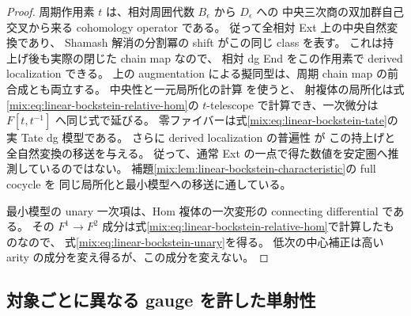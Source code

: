 \begin{proof}
周期作用素 $t$ は、相対周囲代数 $B_\epsilon$ から $D_\epsilon$ への
中央三次商の双加群自己交叉から来る cohomology operator である。
従って全相対 Ext 上の中央自然変換であり、
Shamash 解消の分割冪の shift がこの同じ class を表す。
これは持上げ後も実際の閉じた chain map なので、
相対 dg End をこの作用素で derived localization できる。
上の augmentation による擬同型は、周期 chain map の前合成とも両立する。
中央性と一元局所化の計算
\cite[Theorem~5.3, Corollary~5.16]{NFMBCLLocalization}を使うと、
射複体の局所化は式\eqref{mix:eq:linear-bockstein-relative-hom}の
$t$-telescope で計算でき、一次微分は $F[t,t^{-1}]$ へ同じ式で延びる。
零ファイバーは式\eqref{mix:eq:linear-bockstein-tate}の実 Tate dg 模型である。
さらに derived localization の普遍性
\cite[Proposition~3.17, Theorem~3.18]{NFMBCLLocalization}が
この持上げと全自然変換の移送を与える。
従って、通常 Ext の一点で得た数値を安定圏へ推測しているのではない。
補題\ref{mix:lem:linear-bockstein-characteristic}の full cocycle を
同じ局所化と最小模型への移送に通している。

最小模型の unary 一次項は、Hom 複体の一次変形の connecting differential である。
その $F^1\to F^2$ 成分は式\eqref{mix:eq:linear-bockstein-relative-hom}で計算したものなので、
式\eqref{mix:eq:linear-bockstein-unary}を得る。
低次の中心補正は高い arity の成分を変え得るが、この成分を変えない。
\end{proof}

\subsection{対象ごとに異なる gauge を許した単射性}


